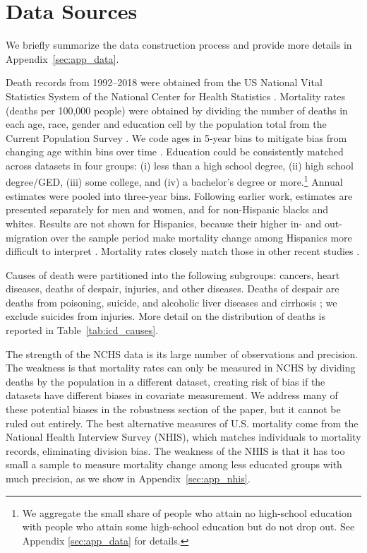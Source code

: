 \documentclass[12pt,letterpaper]{article}
\numberwithin{equation}{section}
\begin{document}
\section{Data Sources}
\label{sec:data}

We briefly summarize the data construction process and provide more
details in Appendix~\ref{sec:app_data}.

Death records from 1992--2018 were obtained from the US National Vital
Statistics System of the National Center for Health Statistics
\citep{NCHS2018}. Mortality rates (deaths per 100,000 people) were
obtained by dividing the number of deaths in each age, race, gender
and education cell by the population total from the Current
Population Survey \citep{cps}. We code ages in 5-year bins to mitigate
bias from changing age within bins over time
\citep{Gelman2016,Case2017}. Education could be consistently matched
across datasets in four groups: (i) less than a high school degree,
(ii) high school degree/GED, (iii) some college, and (iv) a bachelor's
degree or more.\footnote{We aggregate the small share of people who attain no high-school
  education with people who attain some high-school education but do
  not drop out. See Appendix \ref{sec:app_data} for details.} Annual estimates were pooled into three-year bins.
Following earlier work, estimates are presented separately for men and
women, and for non-Hispanic blacks and whites. Results are not shown
for Hispanics, because their higher in- and out-migration over the
sample period make mortality change among Hispanics more difficult to
interpret \citep{Markides2005}. Mortality rates closely match those in
other recent studies \citep{Case2015,Case2017}.

Causes of death were partitioned into the following subgroups:
cancers, heart diseases, deaths of despair, injuries, and other
diseases. Deaths of despair are deaths from poisoning, suicide, and
alcoholic liver diseases and cirrhosis \citep{Kochanek2016,Case2017};
we exclude suicides from injuries. More detail on the distribution of
deaths is reported in Table~\ref{tab:icd_causes}. 

The strength of the NCHS data is its large number of observations and precision. The weakness is that mortality rates can only be measured in NCHS by dividing deaths by the population in a different dataset, creating risk of bias if the datasets have different biases in covariate measurement. We address many of these potential biases in the robustness section of the paper, but it cannot be ruled out entirely. The best alternative measures of U.S. mortality come from the National Health Interview Survey (NHIS), which matches individuals to mortality records, eliminating division bias. The weakness of the NHIS is that it has too small a sample to measure mortality change among less educated groups with much precision, as we show in Appendix~\ref{sec:app_nhis}.
\end{document}

